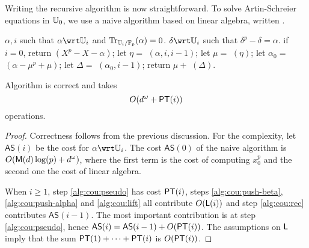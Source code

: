 Writing the recursive algorithm is now straightforward. To solve
Artin-Schreier equations in $\mathbb{U}_0$, we use a naive algorithm based on
linear algebra, written .

\begin{algorithm}
  \caption{}
  \label{alg:artin-schreier}
  \begin{algorithmic}[1]
    \REQUIRE $\alpha,i$ such that $\alpha\wrt\U_i$ and $\operatorname{Tr}_{\mathbb{U}_i/\mathbb{F}_p}(\alpha)=0$.
    \ENSURE $\delta\wrt\U_i$ such that $\delta^p-\delta=\alpha$.
    \STATE \label{alg:cou:base}if $i=0$, return $(X^p-X-\alpha)$;
    \STATE \label{alg:cou:pseudo} let $\eta =$ $(\alpha, i,i-1)$;
    \STATE \label{alg:cou:push-beta} let $\mu=$ $(\eta)$;
    \STATE \label{alg:cou:push-alpha} let $\alpha_0=$ $(\alpha-\mu^p+\mu)$;
    \STATE \label{alg:cou:rec} let $\Delta =$ $(\alpha_0,i-1)$;
    \STATE \label{alg:cou:lift} return $\mu+$ $(\Delta)$.
  \end{algorithmic}
\end{algorithm}

\begin{theorem}\label{theo:AS}
  Algorithm  is
  correct and takes 
  \begin{equation}
    \label{eq:109}
    O(d^\omega + \mathsf{PT}(i))
  \end{equation}
  operations.
\end{theorem}
\begin{proof} 
  Correctness follows from the previous discussion.  For the
  complexity, let $\mathsf{AS}(i)$ be the cost for $\alpha\wrt\U_i$. The
  cost $\mathsf{AS}(0)$ of the naive algorithm is $O(\mathsf{M}(d)\log(p) +
  d^\omega)$, where the first term is the cost of computing $x_0^p$
  and the second one the cost of linear algebra.

  When $i\ge1$, step \ref{alg:cou:pseudo} has cost $\mathsf{PT}(i)$, steps
  \ref{alg:cou:push-beta}, \ref{alg:cou:push-alpha} and
  \ref{alg:cou:lift} all contribute $O(\mathsf{L}(i))$ and step
  \ref{alg:cou:rec} contributes $\mathsf{AS}(i-1)$. The most important
  contribution is at step \ref{alg:cou:pseudo}, hence $\mathsf{AS}(i) =
  \mathsf{AS}(i-1) + O(\mathsf{PT}(i))$. The assumptions on $\mathsf{L}$ imply that
  the sum $\mathsf{PT}(1) + \cdots + \mathsf{PT}(i)$ is $O(\mathsf{PT}(i))$.
\end{proof}


